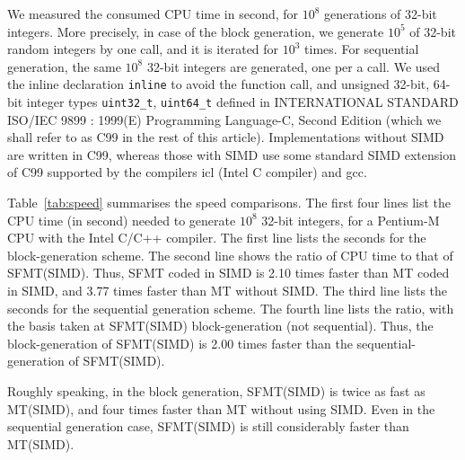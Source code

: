 \documentclass{svmult}
\begin{document}
We measured the consumed CPU time in second, 
for $10^8$ generations of 32-bit integers. More precisely,
in case of the block generation, we generate $10^5$
of 32-bit random integers by one call, and it is iterated
for $10^3$ times. 
For sequential generation, the same $10^8$
 32-bit integers are generated, one per a call.
We used the inline declaration
{\tt inline} to avoid the function call,
and unsigned 32-bit, 64-bit integer types 
{\tt uint32\_t}, {\tt uint64\_t} defined in 
INTERNATIONAL STANDARD ISO/IEC 9899 : 1999(E) 
Programming Language-C, Second Edition
(which we shall refer to as C99 in the rest of this article).
Implementations without SIMD are written in C99,
whereas those with SIMD use
some standard SIMD extension of C99 supported by 
the compilers icl (Intel C compiler) and gcc.

Table~\ref{tab:speed} summarises the speed comparisons.
 The first four lines list the CPU time
(in second) needed to generate $10^8$ 
32-bit integers, for a Pentium-M CPU with the Intel C/C++
compiler. The first line lists the seconds for the
block-generation scheme. The second line shows the 
ratio of CPU time to that of 
SFMT(SIMD). Thus, SFMT coded in SIMD is 2.10 times
faster than MT coded in SIMD, and 3.77 times faster
than MT without SIMD. The third line lists the seconds
for the sequential generation scheme. The fourth line
lists the ratio, with the basis taken
at SFMT(SIMD) block-generation (not sequential). 
Thus, the block-generation of SFMT(SIMD) is 2.00 times
faster than the sequential-generation of SFMT(SIMD).

Roughly speaking, in the block generation, 
SFMT(SIMD) is twice as fast as MT(SIMD),
and four times faster than MT without using SIMD.
Even in the sequential generation case,
SFMT(SIMD) is still considerably faster than MT(SIMD).
\end{document}
